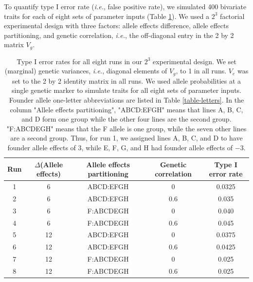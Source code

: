 \documentclass[12pt,twoside, lineno]{gsajnl}
\begin{document}
To quantify type I error rate ({\em i.e.}, false positive rate), we simulated 400 bivariate traits for each of eight sets of parameter inputs (Table \ref{table-typeI}). We used a $2^3$ factorial experimental design with three factors: allele effects difference, allele effects partitioning, and genetic correlation, \textit{i.e.}, the off-diagonal entry in the 2 by 2 matrix $V_g$.

\begin{center}
\begin{table}
\small
  \begin{tabular}{ c | c | c | c | c}
    \hline
    Run & $\Delta$(Allele effects) & Allele effects partitioning & Genetic correlation & Type I error rate \\ \hline
    1 & 6 & ABCD:EFGH & 0 & 0.0325\\ 
    2 & 6 & ABCD:EFGH & 0.6 & 0.035\\ 
    3 & 6 & F:ABCDEGH & 0 & 0.040\\
    4 & 6 & F:ABCDEGH & 0.6 & 0.045\\ 
    5 & 12 & ABCD:EFGH & 0 & 0.0375\\ 
    6 & 12 & ABCD:EFGH & 0.6 & 0.0425\\
    7 & 12 & F:ABCDEGH & 0 & 0.025\\ 
    8 & 12 & F:ABCDEGH & 0.6 & 0.025\\ 
    \hline
  \end{tabular}
  \caption{Type I error rates for all eight runs in our $2^3$ experimental design. We set (marginal) genetic variances, \emph{i.e.}, diagonal elements of $V_g$, to 1 in all runs. $V_e$ was set to the 2 by 2 identity matrix in all runs. We used allele probabilities at a single genetic marker to simulate traits for all eight sets of parameter inputs. Founder allele one-letter abbreviations are listed in Table \ref{table-letters}. In the column "Allele effects partitioning", "ABCD:EFGH" means that lines A, B, C, and D form one group while the other four lines are the second group. "F:ABCDEGH" means that the F allele is one group, while the seven other lines are a second group. Thus, for run 1, we assigned lines A, B, C, and D to have founder allele effects of $3$, while E, F, G, and H had founder allele effects of $-3$.}
  \label{table-typeI}
  \end{table}
\end{center}
\end{document}
